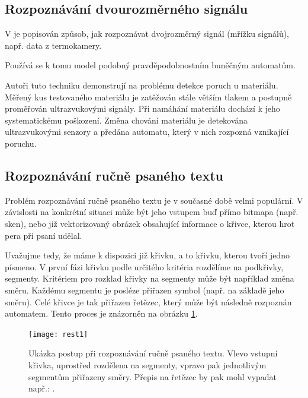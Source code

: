 \documentclass[a4paper,10pt]{article}
\begin{document}
\subsection{Rozpoznávání dvourozměrného signálu}
V \cite{Jin+-WavBasFeaExtUsPrFiStAuPatCla} je popisován způsob, jak rozpoznávat dvojrozměrný signál (mřížku signálů), např. data z termokamery.

Používá se k tomu model podobný pravděpodobnostním buněčným automatům. 

Autoři tuto techniku demonstrují na problému detekce poruch u materiálu. Měřený kus testovaného materiálu je zatěžován stále větším tlakem a postupně proměřován ultrazvukovými signály. Při namáhání materiálu dochází k jeho systematickému poškození. Změna chování materiálu je detekována ultrazvukovými senzory a předána automatu, který v nich rozpozná vznikající poruchu.

\subsection{Rozpoznávání ručně psaného textu} \label{subs:RecHandWrit}
Problém rozpoznávání ručně psaného textu je v současné době velmi populární. V závislosti na konkrétní situaci může být jeho vstupem buď přímo bitmapa (např. sken), nebo již vektorizovaný obrázek obsahující informace o křivce, kterou hrot pera při psaní udělal.

Uvažujme tedy, že máme k dispozici již křivku, a to křivku, kterou tvoří jedno písmeno. V první fázi křivku podle určitého kritéria rozdělíme na podkřivky, segmenty. Kritériem pro rozklad křivky na segmenty může být například změna směru. Každému segmentu je posléze přiřazen symbol (např. na základě jeho směru). Celé křivce je tak přiřazen řetězec, který může být následně rozpoznán automatem. Tento proces je znázorněn na obrázku \ref{img:HandWritEx}.

\begin{figure}
 \centering
 
 \texttt{[image: rest1]}
 
 \caption[Ukázka postupu při rozpoznávání ručně psaného textu]{Ukázka postup při rozpoznávání ručně psaného textu. Vlevo vstupní křivka, uprostřed rozdělena na segmenty, vpravo pak jednotlivým segmentům přiřazeny směry. Přepis na řetězec by pak mohl vypadat např.:       .}
 \label{img:HandWritEx}
\end{figure}
\end{document}
